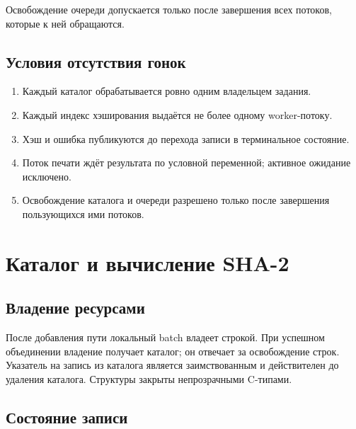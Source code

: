 \documentclass[12pt,a4paper]{article}
\begin{document}
Освобождение очереди допускается только после завершения всех потоков,
которые к ней обращаются.

\subsection{Условия отсутствия гонок}

\begin{enumerate}
\item Каждый каталог обрабатывается ровно одним владельцем задания.
\item Каждый индекс хэширования выдаётся не более одному worker-потоку.
\item Хэш и ошибка публикуются до перехода записи в терминальное состояние.
\item Поток печати ждёт результата по условной переменной;
активное ожидание исключено.
\item Освобождение каталога и очереди разрешено только после завершения
пользующихся ими потоков.
\end{enumerate}

\section{Каталог и вычисление SHA-2}

\subsection{Владение ресурсами}

После добавления пути локальный batch владеет строкой. При успешном
объединении владение получает каталог; он отвечает за освобождение строк.
Указатель на запись из каталога является заимствованным и действителен до
удаления каталога. Структуры закрыты непрозрачными C-типами.

\subsection{Состояние записи}

\begin{center}
\end{center}
\end{document}
